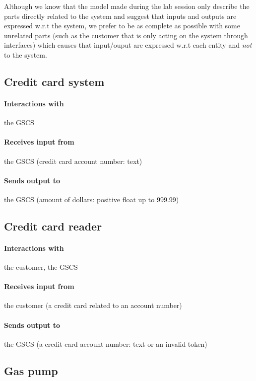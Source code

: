 Although we know that the model made during the lab session only describe the
parts directly related to the system and suggest that inputs and outputs are
expressed w.r.t the system, we prefer to be as complete as possible with some
unrelated parts (such as the customer that is only acting on the system through
interfaces) which causes that input/ouput are expressed w.r.t each entity and
\textit{not} to the system.

\subsection{Credit card system}

\paragraph{Interactions with} the GSCS

\paragraph{Receives input from} the GSCS (credit card account number: text)

\paragraph{Sends output to} the GSCS (amount of dollars: positive float up to
999.99)

\subsection{Credit card reader}

\paragraph{Interactions with} the customer, the GSCS

\paragraph{Receives input from} the customer (a credit card related to an
account number)

\paragraph{Sends output to} the GSCS (a credit card account number: text or
an invalid token)

\subsection{Gas pump}

